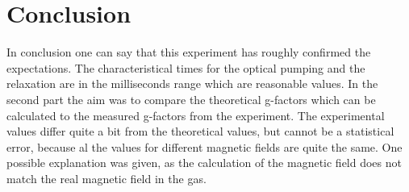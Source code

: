 \section{Conclusion}
In conclusion one can say that this experiment has roughly confirmed the expectations. The characteristical times for the optical pumping and the relaxation are in the milliseconds range which are reasonable values. In the second part the aim was to compare the theoretical g-factors which can be calculated to the measured g-factors from the experiment. The experimental values differ quite a bit from the theoretical values, but cannot be a statistical error, because al the values for different magnetic fields are quite the same. One possible explanation was given, as the calculation of the magnetic field does not match the real magnetic field in the gas.
